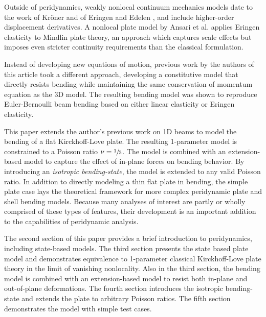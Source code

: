 \documentclass[preprint,review,12pt]{elsarticle}
\begin{document}
 Outside of peridynamics, weakly nonlocal continuum mechanics models date to the work of Kr\"oner \cite{kroner1967elasticity} and of Eringen and Edelen \cite{eringen1972nonlocal}, and include higher-order displacement derivatives.  A nonlocal plate model by Ansari et al. \cite{ansari2010nonlocal} applies Eringen elasticity to Mindlin plate theory, an approach which captures scale effects but imposes even stricter continuity requirements than the classical formulation.

Instead of developing new equations of motion, previous work by the authors of this article took a different approach, developing a constitutive model that directly resists bending while maintaining the same conservation of momentum equation as the 3D model.  The resulting bending model was shown to reproduce Euler-Bernoulli beam bending based on either linear elasticity or Eringen elasticity.

This paper extends the author's previous work on 1D beams to model the bending of a flat Kirckhoff-Love plate.  The resulting 1-parameter model is constrained to a Poisson ratio \(\nu=\sfrac{1}{3}\).  The model is combined with an extension-based model to capture the effect of in-plane forces on bending behavior.  By introducing an \emph{isotropic bending-state}, the model is extended to any valid Poisson ratio.  In addition to directly modeling a thin flat plate in bending, the simple plate case lays the theoretical framework for more complex peridynamic plate and shell bending models.  Because many analyses of interest are partly or wholly comprised of these types of features, their development is an important addition to the capabilities of peridynamic analysis.

The second section of this paper provides a brief introduction to peridynamics, including state-based models.  The third section presents the state based plate model and demonstrates equivalence to 1-parameter classical Kirckhoff-Love plate theory in the limit of vanishing nonlocality.  Also in the third section, the bending model is combined with an extension-based model to resist both in-plane and out-of-plane deformations.  The fourth section introduces the isotropic bending-state and extends the plate to arbitrary Poisson ratios.  The fifth section demonstrates the model with simple test cases.

%
\end{document}

